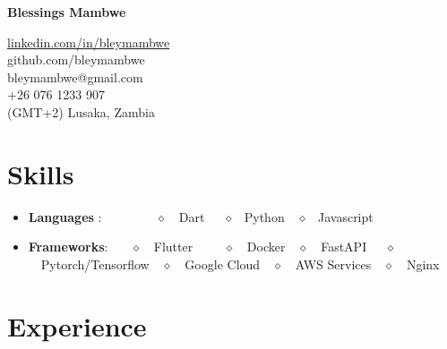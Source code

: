\documentclass[a4paper,11pt]{article}
\makeatletter
\newcommand{\resumeItem}[2]{
  \item\small{
    \textbf{#1}{: #2 \vspace{-2pt}}
  }
}
\newcommand{\resumeSubItem}[2]{\resumeItem{#1}{#2}\vspace{-4pt}}
\newcommand{\resumeSubHeadingListStart}{\begin{itemize}[leftmargin=*]}
\newcommand{\resumeSubHeadingListEnd}{\end{itemize}}
\newcommand{\mytitle}{\textbf{{\huge {Blessings Mambwe}}}}
\newcommand{\intro}{
Inquisitive and self-motivated machine learning researcher looking to attend a master's program with funding or work in a lab where I can use my skills in mechanics and linear algebra to build physics informed machine learning models.}}
\newcommand{\email}{%
\href{mailto:bleymambwe@gmail.com}{\scriptsize{\faEnvelope{}}} bleymambwe@gmail.com}
\newcommand{\linkedin}{
\href{https://linkedin.com/in/bleymambwe/} {linkedin.com/in/bleymambwe}}
\newcommand{\gitlab}{
\href{https://gitlab.com/bleymambwe}{\faGitlab{}} gitlab.com/bleymambwe}
\newcommand{\github}{
\href{https://github.com/bleymambwe}{\faGithub{}} github.com/bleymambwe}
\newcommand{\portfolio}{\href{https://www.dropbox.com/sh/p7llir6jzn9ey2e/AAA5wInAs7B0Ttw2MomihMpda?dl=0}\faFolderOpen Portfolio : {https://cutt.ly/FKrfhQ6} }
\newcommand{\addressBR}{%
\hspace{1pt}\faMapMarker{}\hspace{1pt}(GMT+2) Lusaka, Zambia}
\newcommand{\phoneBR}{%
\href{tel:+260761233907}{\faWhatsapp{}} +26 076 1233 907}%
\makeatother
\begin{document}
%


\vspace{-10pt}
\begin{minipage}{0.73\linewidth}%
    {\centering
        \mytitle{}\par
    }
    \vspace{6pt}
    
\end{minipage}
\hspace{6pt}
\begin{minipage}{0.243\linewidth}
    {\flushleft
        \vspace{25pt}
        \small{
        \linkedin{}\\
        \github{}\\
         \email{}\\
         \phoneBR{}\\
        \addressBR{}\\
        }
    }
\end{minipage}

\vspace{-5pt}

\section{Skills}
 \resumeSubHeadingListStart
 \resumeSubItem{Languages \faCode }{~~~~~~~~$\diamond$~~Dart~~~$\diamond$ ~Python~~$\diamond$ ~Javascript~~   }
 
\resumeSubItem{Frameworks}{~~~$\diamond$~~Flutter~~~~~$\diamond$~~Docker~~$\diamond$~~FastAPI~~~$\diamond$~~Pytorch/Tensorflow~~$\diamond$~~Google Cloud~~$\diamond$~~AWS Services~~$\diamond$~~Nginx~~  }

\resumeSubHeadingListEnd



\section{Experience}
\end{document}
